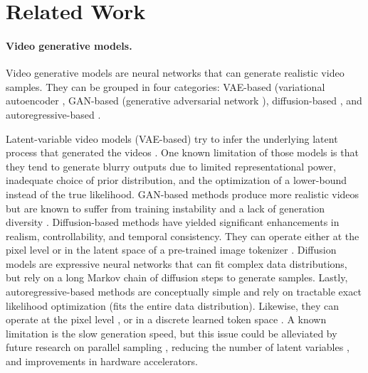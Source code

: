 \clearpage
\section{Related Work}


\paragraph{Video generative models.} 
Video generative models are neural networks that can generate realistic video samples. They can be grouped in four categories: VAE-based (variational autoencoder \citep{kingma14}, GAN-based (generative adversarial network \citep{goodfellow14}), diffusion-based \citep{sohl-dickstein15}, and autoregressive-based \citep{pixelcnn16}. 

Latent-variable video models (VAE-based) try to infer the underlying latent process that generated the videos \citep{babaeizadeh18,denton18,villegas19,franceschi20,fitvid21}. One known limitation of those models is that they tend to generate blurry outputs due to limited representational power, inadequate choice of prior distribution, and the optimization of a lower-bound instead of the true likelihood. GAN-based methods produce more realistic videos \citep{vondrick16,tulyakov18,clark19,kim2021drivegan,skorokhodov22,brooks22} but are known to suffer from training instability and a lack of generation diversity \citep{goodfellow2016tutorial}. Diffusion-based methods have yielded significant enhancements in realism, controllability, and temporal consistency. They can operate either at the pixel level \citep{ho2022video,harvey2022flexible,voleti22,hoppe22,singer22,molad2023dreamix,ho2022imagen} or in the latent space of a pre-trained image tokenizer \citep{Zhou2022MagicVideoEV,esser2023structure,blattmann2023align}. Diffusion models are expressive neural networks that can fit complex data distributions, but rely on a long Markov chain of diffusion steps to generate samples. Lastly, autoregressive-based methods are conceptually simple and rely on tractable exact likelihood optimization (fits the entire data distribution). Likewise, they can operate at the pixel level \citep{kalchbrenner16,Weissenborn20}, or in a discrete learned token space \citep{yan2021videogpt,moing21,ge2022long,seo22}. A known limitation is the slow generation speed, but this issue could be alleviated by future research on parallel sampling \citep{teco22yan,villegas22phenaki,yu2023magvit}, reducing the number of latent variables \citep{hawthorne22}, and improvements in hardware accelerators.

